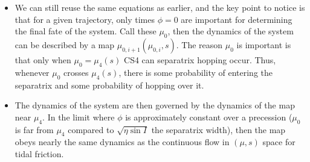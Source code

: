 \documentclass[11pt,
        usenames, %
        dvipsnames %
    ]{article}
\newcommand*{\p}[1]{\left(#1\right)}
\begin{document}
\begin{itemize}
    \item We can still reuse the same equations as earlier, and the key point to
        notice is that for a given trajectory, only times $\phi = 0$ are
        important for determining the final fate of the system. Call these
        $\mu_0$, then the dynamics of the system can be described by a map
        $\mu_{0, i + 1}\p{\mu_{0, i}, s}$. The reason $\mu_0$ is important is
        that only when $\mu_0 = \mu_4(s)$ CS4 can separatrix hopping occur.
        Thus, whenever $\mu_0$ crosses $\mu_4(s)$, there is some probability of
        entering the separatrix and some probability of hopping over it.

    \item The dynamics of the system are then governed by the dynamics of the
        map near $\mu_4$. In the limit where $\phi$ is approximately constant
        over a precession ($\mu_0$ is far from $\mu_4$ compared to $\sqrt{\eta
        \sin I}$ the separatrix width), then the map obeys nearly the same
        dynamics as the continuous flow in $(\mu, s)$ space for tidal friction.


\end{itemize}
\end{document}
